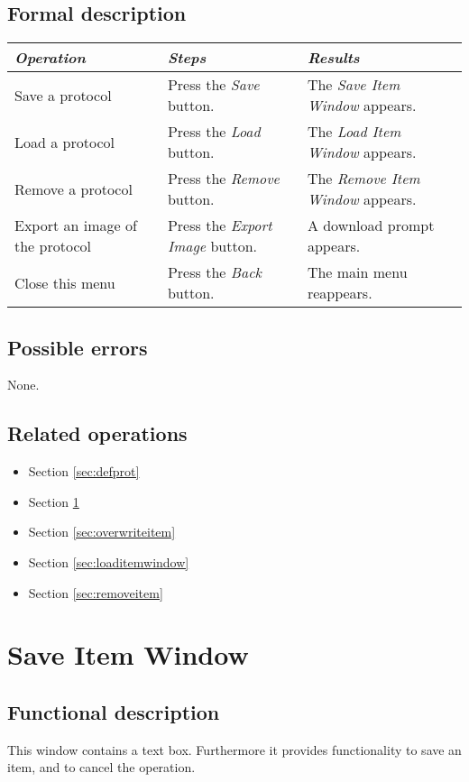   \subsection*{Formal description}
    \begin{tabularx}{\textwidth}{XXX}
    \toprule
    \emph{Operation} & \emph{Steps} & \emph{Results} \\
    \midrule
    Save a protocol & Press the \emph{Save} button. & The \emph{Save Item Window} appears. \\
    \midrule
    Load a protocol & Press the \emph{Load} button. & The \emph{Load Item Window} appears. \\
    \midrule
    Remove a protocol & Press the \emph{Remove} button. & The \emph{Remove Item Window} appears. \\
    \midrule
    Export an image of the protocol & Press the \emph{Export Image} button. & A download prompt appears. \\
    \midrule
    Close this menu & Press the \emph{Back} button. & The main menu reappears. \\
    \bottomrule
  \end{tabularx}

  \subsection*{Possible errors}
  None.
  
  \subsection*{Related operations}
    \begin{itemize}
    \item Section \ref{sec:defprot}
    \item Section \ref{sec:saveitem}
    \item Section \ref{sec:overwriteitem}
    \item Section \ref{sec:loaditemwindow}
    \item Section \ref{sec:removeitem}
  \end{itemize}

\section{Save Item Window}
\label{sec:saveitem}
  \subsection*{Functional description}
  This window contains a text box. Furthermore it provides functionality to save an item, and to cancel the operation.

